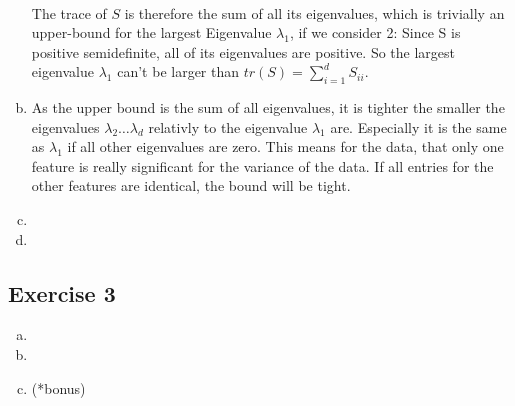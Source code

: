 \documentclass[10pt,a4paper]{article}
\begin{document}
\begin{enumerate}[(a)]
\begin{align*}
\end{align*}
The trace of $S$ is therefore the sum of all its eigenvalues, which is trivially an upper-bound for the largest Eigenvalue $\lambda_1$, if we consider 2: Since S is positive semidefinite, all of its eigenvalues are positive. So the largest eigenvalue $\lambda_1$ can't be larger than $tr(S) = \sum^d_{i=1} S_{ii}$.
\item As the upper bound is the sum of all eigenvalues, it is tighter the smaller the eigenvalues $\lambda_2 \dots \lambda_d$ relativly to the eigenvalue $\lambda_1$ are. Especially it is the same as $\lambda_1$ if all other eigenvalues are zero. This means for the data, that only one feature is really significant for the variance of the data. If all entries for the other features are identical, the bound will be tight.
\item 
\item
\end{enumerate}
\subsection*{Exercise 3}
\begin{enumerate}[(a)]
\item
\item
\item (*bonus)
\end{enumerate}
\end{document}
